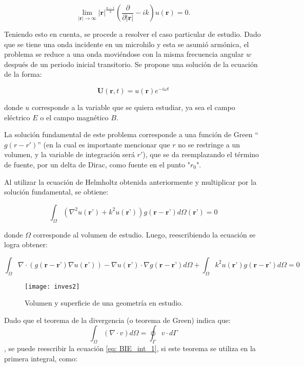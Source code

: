\documentclass[12pt,letterpaper]{article}
\numberwithin{equation}{section}
\begin{document}
\begin{equation}
\lim\limits_{|\textbf{r}|\rightarrow\infty}|\textbf{r}|^{\frac{n-1}{2}}\left(\frac{\partial}{\partial|\textbf{r}|}-ik\right)u(\textbf{r})=0.
\label{eq:Sommerfeld radiation condition}
\end{equation} 

Teniendo esto en cuenta, se procede a resolver el caso particular de estudio. Dado que se tiene una onda incidente en un microhilo y esta se asumió armónica, el problema se reduce a una onda moviéndose con la misma frecuencia angular $w$ después de un periodo inicial transitorio. Se propone una solución de la ecuación de la forma:

$$\textbf{U}(\textbf{r},t) = u(\textbf{r})e^{-i\omega t}$$ 

\noindent donde $u$ corresponde a la variable que se quiera estudiar, ya sea el campo eléctrico $E$ o el campo magnético $B$.

La solución fundamental de este problema corresponde a una función de Green ``$g(r-r')$'' (en la cual es importante mencionar que $r$ no se restringe a un volumen, y la variable de integración será $r'$), que se da reemplazando el término de fuente, por un delta de Dirac, como fuente en el punto "$r_{0}$".

Al utilizar la ecuación de Helmholtz obtenida anteriormente y multiplicar por la solución fundamental, se obtiene:

\begin{equation}
\int_{\Omega}(\nabla^2u(\textbf{r'})+k^2u(\textbf{r'}))g(\textbf{r}-\textbf{r'})d\varOmega(\textbf{r'})=0
\label{eq:Helmholtz*Green}
\end{equation}

\noindent donde $\Omega$ corresponde al volumen de estudio. Luego, reescribiendo la ecuación se logra obtener:

\begin{equation}
\int_{\Omega}\nabla\cdot (g(\textbf{r}-\textbf{r'})\nabla u(\textbf{r'}))-\nabla u(\textbf{r'})\cdot\nabla g(\textbf{r}-\textbf{r'}) d\varOmega+\int_{\Omega}k^2u(\textbf{r'})g(\textbf{r}-\textbf{r'})d\varOmega=0
\label{eq: BIE_int_1}
\end{equation}

\begin{figure}[H]
	\centering
	\texttt{[image: inves2]}
	\caption{Volumen y superficie de una geometría en estudio. \cite{paperBEMpp}}
\end{figure}


Dado que el teorema de la divergencia (o teorema de Green) indica que: $$\int_{\Omega}(\nabla\cdot v)d\varOmega=\oint_{\Gamma}v\cdot d\varGamma$$, 
\noindent se puede reescribir la ecuación \ref{eq: BIE_int_1}, si este teorema se utiliza en la primera integral, como:
\end{document}
